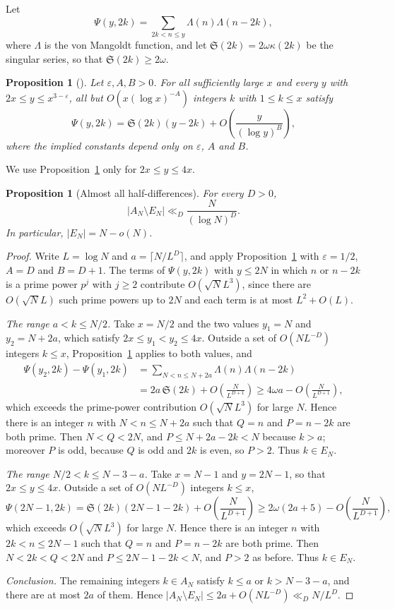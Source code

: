 \documentclass[11pt]{amsart}
\newtheorem{Proposition}[Theorem]{Proposition}
\theoremstyle{definition}
\theoremstyle{remark}
\begin{document}
Let
\[
\Psi(y,2k)=\sum_{2k<n\leq y}\Lambda(n)\Lambda(n-2k),
\]
where $\Lambda$ is the von Mangoldt function, and let $\mathfrak S(2k)=2\omega\kappa(2k)$ be the singular series, so that $\mathfrak S(2k)\geq 2\omega$.
\begin{Proposition}[{\cite{mikawa1991prime}}]\label{prop:mikawa}
Let $\varepsilon,A,B>0$. For all sufficiently large $x$ and every $y$ with $2x\leq y\leq x^{3-\varepsilon}$, all but $O(x(\log x)^{-A})$ integers $k$ with $1\leq k\leq x$ satisfy
\[
\Psi(y,2k)=\mathfrak S(2k)(y-2k)+O\!\left(\frac{y}{(\log y)^{B}}\right),
\]
where the implied constants depend only on $\varepsilon$, $A$ and $B$.
\end{Proposition}
We use Proposition~\ref{prop:mikawa} only for $2x\leq y\leq 4x$.
\begin{Proposition}[Almost all half-differences]\label{prop:almost-all}
For every $D>0$,
\[
|A_N\setminus E_N|\ll_D\frac{N}{(\log N)^D}.
\]
In particular, $|E_N|=N-o(N)$.
\end{Proposition}
\begin{proof}
Write $L=\log N$ and $a=\lceil N/L^D\rceil$, and apply Proposition~\ref{prop:mikawa} with $\varepsilon=1/2$, $A=D$ and $B=D+1$. The terms of $\Psi(y,2k)$ with $y\leq 2N$ in which $n$ or $n-2k$ is a prime power $p^j$ with $j\geq 2$ contribute $O(\sqrt N L^3)$, since there are $O(\sqrt N L)$ such prime powers up to $2N$ and each term is at most $L^2+O(L)$.

\emph{The range $a<k\leq N/2$.} Take $x=N/2$ and the two values $y_1=N$ and $y_2=N+2a$, which satisfy $2x\leq y_1<y_2\leq 4x$. Outside a set of $O(NL^{-D})$ integers $k\leq x$, Proposition~\ref{prop:mikawa} applies to both values, and
\begin{align*}
\Psi(y_2,2k)-\Psi(y_1,2k)&=\sum_{N<n\leq N+2a}\Lambda(n)\Lambda(n-2k)\\
&=2a\,\mathfrak S(2k)+O\!\left(\frac{N}{L^{D+1}}\right)\geq 4\omega a-O\!\left(\frac{N}{L^{D+1}}\right),
\end{align*}
which exceeds the prime-power contribution $O(\sqrt N L^3)$ for large $N$. Hence there is an integer $n$ with $N<n\leq N+2a$ such that $Q=n$ and $P=n-2k$ are both prime. Then $N<Q<2N$, and $P\leq N+2a-2k<N$ because $k>a$; moreover $P$ is odd, because $Q$ is odd and $2k$ is even, so $P>2$. Thus $k\in E_N$.

\emph{The range $N/2<k\leq N-3-a$.} Take $x=N-1$ and $y=2N-1$, so that $2x\leq y\leq 4x$. Outside a set of $O(NL^{-D})$ integers $k\leq x$,
\[
\Psi(2N-1,2k)=\mathfrak S(2k)(2N-1-2k)+O\!\left(\frac{N}{L^{D+1}}\right)\geq 2\omega(2a+5)-O\!\left(\frac{N}{L^{D+1}}\right),
\]
which exceeds $O(\sqrt N L^3)$ for large $N$. Hence there is an integer $n$ with $2k<n\leq 2N-1$ such that $Q=n$ and $P=n-2k$ are both prime. Then $N<2k<Q<2N$ and $P\leq 2N-1-2k<N$, and $P>2$ as before. Thus $k\in E_N$.

\emph{Conclusion.} The remaining integers $k\in A_N$ satisfy $k\leq a$ or $k>N-3-a$, and there are at most $2a$ of them. Hence $|A_N\setminus E_N|\leq 2a+O(NL^{-D})\ll_D N/L^D$.
\end{proof}
\end{document}
